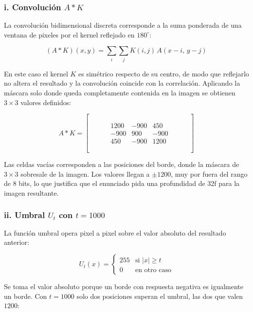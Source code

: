 \documentclass[12pt, a4paper]{article}
\newcommand{\vacia}{\phantom{0000}}
\begin{document}
\subsubsection*{i. Convolución $A * K$}

La convolución bidimensional discreta corresponde a la suma ponderada de una ventana de pixeles por el kernel reflejado en $180^\circ$:

\begin{equation}
(A * K)(x,y) = \sum_{i}\sum_{j} K(i,j)\, A(x-i,\, y-j)
\end{equation}

En este caso el kernel $K$ es simétrico respecto de su centro, de modo que reflejarlo no altera el resultado y la convolución coincide con la correlación. Aplicando la máscara solo donde queda completamente contenida en la imagen se obtienen $3 \times 3$ valores definidos:

\[
A * K =
\begin{bmatrix}
\vacia & \vacia & \vacia & \vacia & \vacia \\
\vacia & 1200 & -900 & 450 & \vacia \\
\vacia & -900 & 900 & -900 & \vacia \\
\vacia & 450 & -900 & 1200 & \vacia \\
\vacia & \vacia & \vacia & \vacia & \vacia
\end{bmatrix}
\]

Las celdas vacías corresponden a las posiciones del borde, donde la máscara de $3 \times 3$ sobresale de la imagen. Los valores llegan a $\pm 1200$, muy por fuera del rango de 8 bits, lo que justifica que el enunciado pida una profundidad de 32f para la imagen resultante.

\subsubsection*{ii. Umbral $U_t$ con $t = 1000$}

La función umbral opera pixel a pixel sobre el valor absoluto del resultado anterior:

\begin{equation}
U_t(x) =
\begin{cases}
255 & \text{si } |x| \geq t \\
0 & \text{en otro caso}
\end{cases}
\end{equation}

Se toma el valor absoluto porque un borde con respuesta negativa es igualmente un borde. Con $t = 1000$ solo dos posiciones superan el umbral, las dos que valen $1200$:
\end{document}
